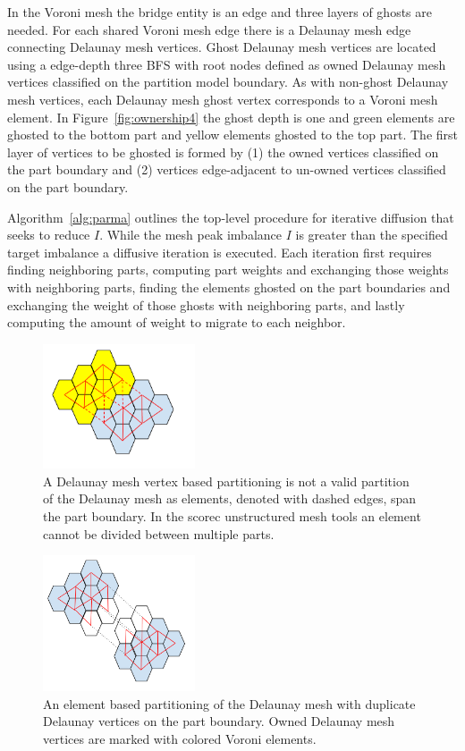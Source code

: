\documentclass[a4paper]{article}
\begin{document}
In the Voroni mesh the bridge entity is an edge and three layers of ghosts are needed.  For each shared Voroni mesh edge there is a Delaunay mesh edge connecting Delaunay mesh vertices.  Ghost Delaunay mesh vertices are located using a edge-depth three BFS with root nodes defined as owned Delaunay mesh vertices classified on the partition model boundary.  As with non-ghost Delaunay mesh vertices, each Delaunay mesh ghost vertex corresponds to a Voroni mesh element.  In Figure~\ref{fig:ownership4} the ghost depth is one and green elements are ghosted to the bottom part and yellow elements ghosted to the top part.  The first layer of vertices to be ghosted is formed by (1) the owned vertices classified on the part boundary and (2) vertices edge-adjacent to un-owned vertices classified on the part boundary.

Algorithm~\ref{alg:parma} outlines the top-level procedure for iterative diffusion that seeks to reduce $I$.  While the mesh peak imbalance $I$ is greater than the specified target imbalance a diffusive iteration is executed.  Each iteration first requires finding neighboring parts, computing part weights and exchanging those weights with neighboring parts, finding the elements ghosted on the part boundaries and exchanging the weight of those ghosts with neighboring parts, and lastly computing the amount of weight to migrate to each neighbor.  

\begin{figure} 
\centering
\includegraphics[width=0.4\textwidth]{ghostingOwnershipFig2.png}
\caption{\label{fig:ownership2} A Delaunay mesh vertex based partitioning is not a valid partition of the Delaunay mesh as elements, denoted with dashed edges, span the part boundary.  In the scorec unstructured mesh tools an element cannot be divided between multiple parts.}
\end{figure}

\begin{figure} 
\centering
\includegraphics[width=0.4\textwidth]{ghostingOwnershipFig3.png}
\caption{\label{fig:ownership3} An element based partitioning of the Delaunay mesh with duplicate Delaunay vertices on the part boundary.  Owned Delaunay mesh vertices are marked with colored Voroni elements.}
\end{figure}
\end{document}

